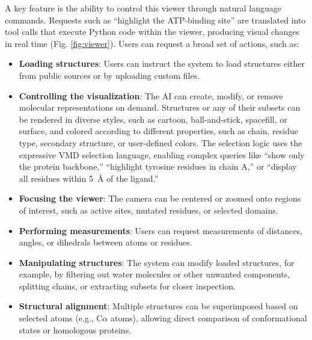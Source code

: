 \documentclass{article}
\begin{document}
A key feature is the ability to control this viewer through natural language commands. Requests such as “highlight the ATP-binding site” are translated into tool calls that execute Python code within the viewer, producing visual changes in real time (Fig. \ref{fig:viewer}). Users can request a broad set of actions, such as:
\begin{itemize}[leftmargin=1em]
    \item \textbf{Loading structures}: Users can instruct the system to load structures either from public sources or by uploading custom files.
    \item \textbf{Controlling the visualization}: The AI can create, modify, or remove molecular representations on demand. Structures or any of their subsets can be rendered in diverse styles, such as cartoon, ball-and-stick, spacefill, or surface, and colored according to different properties, such as chain, residue type, secondary structure, or user-defined colors. The selection logic uses the expressive VMD selection language, enabling complex queries like “show only the protein backbone,” “highlight tyrosine residues in chain A,” or “display all residues within 5~\AA{} of the ligand.”
    \item \textbf{Focusing the viewer}: The camera can be centered or zoomed onto regions of interest, such as active sites, mutated residues, or selected domains.
    \item \textbf{Performing measurements}: Users can request measurements of distances, angles, or dihedrals between atoms or residues.
    \item \textbf{Manipulating structures}: The system can modify loaded structures, for example, by filtering out water molecules or other unwanted components, splitting chains, or extracting subsets for closer inspection.
    \item \textbf{Structural alignment}: Multiple structures can be superimposed based on selected atoms (e.g., C$\alpha$ atoms), allowing direct comparison of conformational states or homologous proteins.    

\end{itemize}



\end{document}
